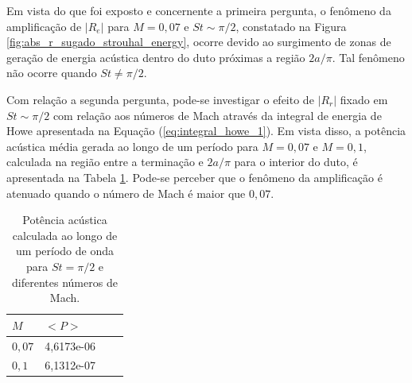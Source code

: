 Em vista do que foi exposto e concernente a primeira pergunta, o fenômeno da amplificação de $|R_{e}|$ para $M = 0,07$ e $St \sim \pi/2$, constatado na Figura \ref{fig:abs_r_sugado_strouhal_energy}, ocorre devido ao surgimento de zonas de geração de energia acústica dentro do duto próximas a região $2a/\pi$. Tal fenômeno não ocorre quando $St \neq \pi/2$.

Com relação a segunda pergunta, pode-se investigar o efeito de $|R_{r}|$ fixado em $St \sim \pi/2$ com relação aos números de Mach através da integral de energia de Howe apresentada na Equação (\ref{eq:integral_howe_1}). Em vista disso, a potência acústica média gerada ao longo de um período para $M = 0,07$ e $M = 0,1$, calculada na região entre a terminação e $2a/\pi$ para o interior do duto, é apresentada na Tabela \ref{table:potencia_mach}. Pode-se perceber que o fenômeno da amplificação é atenuado quando o número de Mach é maior que $0,07$. 

\begin{table}[ht!]
\centering
\caption{Potência acústica calculada ao longo de um período de onda para $St = \pi/2$ e diferentes números de Mach.}
\label{table:potencia_mach}
    \begin{tabular}{|l|l|l|l|}
        \hline
        $M$ & $<P>$ \\ \hline
        $0,07$ & 4,6173e-06  \\ \hline  
        $0,1$ & 6,1312e-07 \\ \hline
    \end{tabular}
\end{table}

